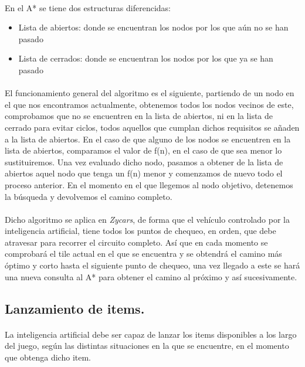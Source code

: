 \paragraph{}
En el A* se tiene dos estructuras diferencidas:

\begin{itemize}
    \item Lista de abiertos: donde se encuentran los nodos por los que aún no se han pasado
    \item Lista de cerrados: donde se encuentran los nodos por los que ya se han pasado
\end{itemize}

\paragraph{}
El funcionamiento general del algoritmo es el siguiente, partiendo de un nodo en el que nos encontramos actualmente,
obtenemos todos los nodos vecinos de este, comprobamos que no se encuentren en la lista de abiertos, ni en la lista
de cerrado para evitar ciclos, todos aquellos que cumplan dichos requisitos se añaden a la lista de abiertos. En el caso de que 
alguno de los nodos se encuentren en la lista de abiertos, comparamos el valor de f(n), en el caso de que sea menor lo 
sustituiremos. Una vez evaluado dicho nodo, pasamos a obtener de la lista de abiertos aquel nodo que tenga un f(n) menor y 
comenzamos de nuevo todo el proceso anterior. En el momento en el que llegemos al nodo objetivo, detenemos la búsqueda y devolvemos
el camino completo.

\paragraph{}
Dicho algoritmo se aplica en \emph{Zycars}, de forma que el vehículo controlado por la inteligencia artificial, tiene todos los
puntos de chequeo, en orden, que debe atravesar para recorrer el circuito completo. Así que en cada momento se comprobará
el tile actual en el que se encuentra y se obtendrá el camino más óptimo y corto hasta el siguiente punto de chequeo, una vez
llegado a este se hará una nueva consulta al A* para obtener el camino al próximo y así sucesivamente.

\subsection{Lanzamiento de items.}

\paragraph{}
La inteligencia artificial debe ser capaz de lanzar los items disponibles a los largo del juego, según las distintas 
situaciones en la que se encuentre, en el momento que obtenga dicho item.

